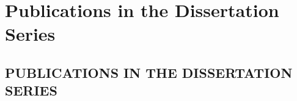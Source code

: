 \documentclass[english]{his-thesis}
\begin{document}

\part*{Publications in the Dissertation Series}
\chapter*{PUBLICATIONS IN THE DISSERTATION SERIES}

\end{document}
